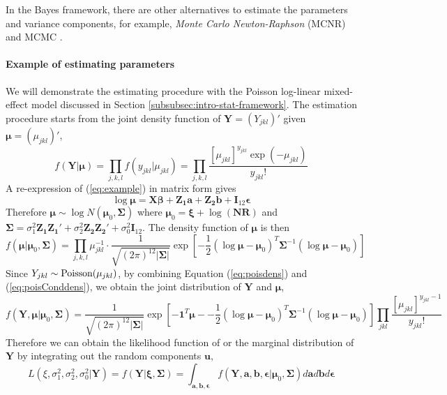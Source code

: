 In the Bayes framework, there are other alternatives to estimate the parameters and variance
components, for example,  \textit{Monte Carlo Newton-Raphson} (MCNR) \citep{mcculloch1997maximum} and  MCMC \citep{hadfield2010mcmc}.

\paragraph{Example of estimating parameters}
We will demonstrate the estimating procedure with the Poisson log-linear mixed-effect model
discussed in Section \ref{subsubsec:intro-stat-framework}.
The estimation procedure starts from the joint density function of $\bm Y=(Y_{jkl})'$ given $\bm
\mu= (\mu_{jkl})'$,
\begin{equation}\label{eq:poisdens}
	f(\bm Y|\bm \mu )=\prod_{ j,
		k,l}f(y_{jkl}|\mu_{jkl})=\prod_{j,k,l}\frac{[\mu_{jkl}]^{y_{jkl}}\exp(-\mu_{jkl})}{y_{jkl}!}
\end{equation}
A re-expression of  (\ref{eq:example}) in matrix form gives 
\[\log\bm \mu= \bm {X\beta} + \bm {Z_1 a} + \bm{Z_2b} + \bm I_{12}\bm \epsilon \]
Therefore  $\bm\mu  \sim \log N(\bm \mu_0, \bm \Sigma)$ where $\bm \mu_0 =\bm\xi + \log(\bm {NR})$
and $\bm \Sigma = \sigma_1^2\bm {Z_1Z_1'} + \sigma_2^2\bm {Z_2 Z_2'} +\sigma_0^2 \bm I_{12}$.
The density function of $\bm \mu$ is then
\begin{equation}\label{eq:poisConddens}
	f(\bm \mu |\bm \mu_0, \bm \Sigma)=\prod_{j,k,l} \mu_{jkl}^{-1}\cdot \frac{1}{
		\sqrt{(2\pi)^{12}|\bm\Sigma|}}\exp[-\frac{1}{2} {(\log\bm \mu - \bm \mu_0)^T\bm \Sigma^{-1}(\log\bm
		\mu - \bm \mu_0)}]
\end{equation}
Since $Y_{jkl}\sim \text{Poisson} (\mu_{jkl})$, by combining Equation (\ref{eq:poisdens}) and
(\ref{eq:poisConddens}), we obtain the joint distribution of $\bm Y$ and $\bm \mu$,
\[f(\bm Y, \bm \mu |\bm \mu_0, \bm \Sigma) =\frac{1}{\sqrt{(2\pi)^{12}|\bm \Sigma|}}\exp[-\bm
1^T\bm \mu - -\frac{1}{2} {(\log\bm \mu - \bm \mu_0)^T\bm \Sigma^{-1}(\log\bm \mu - \bm
	\mu_0)}]\prod_{jkl}\frac{[\mu_{jkl}]^{y_{jkl}-1}}{y_{jkl}!}\]
Therefore we can obtain the likelihood function of or the marginal distribution of $\bm Y$ by
integrating out the random components $\bm u$,
\begin{equation}\label{eq:example-likelihood}
	L(\xi, \sigma_1^2, \sigma_2^2, \sigma_0^2|\bm Y)=f(\bm Y|\bm \xi, \bm \Sigma)=
	\int_{\bm{a,b,\epsilon}} f(\bm Y, \bm a, \bm b, \bm \epsilon |\bm \mu_0, \bm \Sigma)d\bm a d \bm b
	d\bm \epsilon 
\end{equation}
